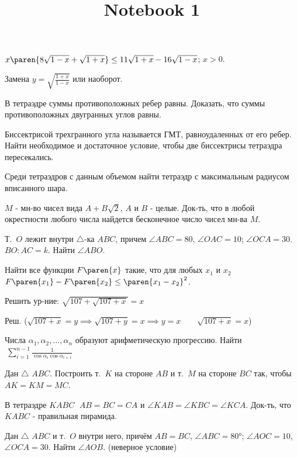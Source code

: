 \documentclass{article}
\title{Notebook 1}
\author{}
\date{}
\newcommand{\strikethrough}[1]{}  %
\begin{document}
\strikethrough{Дан $\triangle$ $ABC$ найти}


\problem[Задача ]  %
$x \paren{8 \sqrt{1 - x} + \sqrt{1 + x}} \leq 11 \sqrt{1 + x} - 16 \sqrt{1 - x}$; $x > 0$.

Замена $y = \sqrt{\frac{1 + x}{1 - x}}$ или наоборот.


\problem[Задача ]  %
В тетраэдре суммы противоположных ребер равны.
Доказать, что суммы противоположных двугранных углов равны.


\problem  %
Биссектрисой трехгранного угла называется ГМТ, равноудаленных от его ребер.
Найти необходимое и достаточное условие, чтобы две биссектрисы тетраэдра пересекались.


\problem  %
Среди тетраэдров с данным объемом найти тетраэдр с максимальным радиусом вписанного шара.


\problem  %
$M$ - мн-во чисел вида $A + B \sqrt{2}$, $A$ и $B$ - целые.
Док-ть, что в любой окрестности любого числа найдется бесконечное число чисел мн-ва $M$.


\problem  %
Т.\ $O$ лежит внутри $\triangle$-ка $ABC$,
причем $\angle ABC = 80$, $\angle OAC = 10$; $\angle OCA = 30$.
$BO : AC = k$. Найти $\angle ABO$.


\problem  %
Найти все функции $F\paren{x}$ такие, что для любых $x_1$ и $x_2 \;$
$F\paren{x_1} - F\paren{x_2} \leq \paren{x_1 - x_2}^2$.


\problem  %
Решить ур-ние: $\sqrt{107 + \sqrt{107 + x}} = x$

Реш.
($\sqrt{107 + x} = y
 \implies
 \sqrt{107 + y} = x
 \implies
 y = x
 \qquad
 \sqrt{107 + x} = x$)


\problem  %
Числа $\alpha_1, \alpha_2, \dotsc, \alpha_n$ образуют арифметическую прогрессию.
Найти $\: \displaystyle{\sum\limits_{i = 1}^{n - 1} \frac{1}{\cos\alpha_i \cos\alpha_{i+1}}}$


\problem  %
Дан $\triangle$ $ABC$.
Построить т.\ $K$ на стороне $AB$ и т.\ $M$ на стороне $BC$ так, чтобы $AK = KM = MC$.


\problem  %
В тетраэдре $KABC$ $\; AB = BC = CA$ и $\angle KAB = \angle KBC = \angle KCA$.
Док-ть, что $KABC$ - правильная пирамида.


\problem  %
Дан $\triangle$ $ABC$ и т.\ $O$ внутри него,
причём $AB = BC$, $\angle ABC = \ang{80}$; $\angle AOC = 10$, $\angle OCA = 30$.
Найти $\angle AOB$.
(неверное условие)
\end{document}
